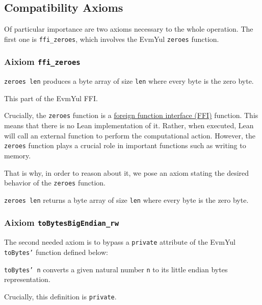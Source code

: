 \subsection{Compatibility Axioms}

Of particular importance are two axioms necessary to the whole operation. The
first one is \texttt{ffi_zeroes}, which involves the EvmYul \texttt{zeroes} function.

\subsubsection{\textbf{Aixiom \texttt{ffi_zeroes}}}

\begin{definition}[zeroes]\label{def:zeroes}
\texttt{zeroes len} produces a byte array of size \texttt{len} where every byte
is the zero byte.

This part of the EvmYul FFI.
\end{definition}

Crucially, the \texttt{zeroes} function is a
\href{https://en.wikipedia.org/wiki/Foreign_function_interface}{foreign function interface (FFI)}
function. This means that there is no Lean implementation of it. Rather, when
executed, Lean will call an external function to perform the computational
action.
However, the \texttt{zeroes} function plays a crucial role in important
functions such as writing to memory.

That is why, in order to reason about it, we pose an axiom stating the desired
behavior of the \texttt{zeroes} function.

\begin{theorem}\label{ax:ffi_zeroes}
\texttt{zeroes len} returns a byte array of size \texttt{len} where every byte
is the zero byte.
\end{theorem}

\subsubsection{\textbf{Aixiom \texttt{toBytesBigEndian_rw}}}

The second needed axiom is to bypass a \texttt{private} attribute of the EvmYul
\texttt{toBytes'} function defined below:

\begin{definition}[toBytes']\label{def:toBytes'}\leanok
\texttt{toBytes' n} converts a given natural number \texttt{n} to its little
endian bytes representation.

Crucially, this definition is \texttt{private}.
\end{definition}

